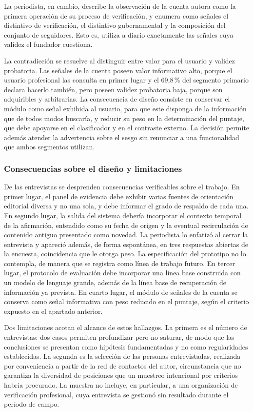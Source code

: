 La periodista, en cambio, describe la observación de la cuenta autora como la primera operación de su proceso de verificación, y enumera como señales el distintivo de verificación, el distintivo gubernamental y la composición del conjunto de seguidores. Esto es, utiliza a diario exactamente las señales cuya validez el fundador cuestiona.

La contradicción se resuelve al distinguir entre valor para el usuario y validez probatoria. Las señales de la cuenta poseen valor informativo alto, porque el usuario profesional las consulta en primer lugar y el 69,8\,\% del segmento primario declara hacerlo también, pero poseen validez probatoria baja, porque son adquiribles y arbitrarias. La consecuencia de diseño consiste en conservar el módulo como señal exhibida al usuario, para que este disponga de la información que de todos modos buscaría, y reducir su peso en la determinación del puntaje, que debe apoyarse en el clasificador y en el contraste externo. La decisión permite además atender la advertencia sobre el sesgo sin renunciar a una funcionalidad que ambos segmentos utilizan.

\subsubsection{Consecuencias sobre el diseño y limitaciones}

De las entrevistas se desprenden consecuencias verificables sobre el trabajo. En primer lugar, el panel de evidencia debe exhibir varias fuentes de orientación editorial diversa y no una sola, y debe informar el grado de respaldo de cada una. En segundo lugar, la salida del sistema debería incorporar el contexto temporal de la afirmación, entendido como su fecha de origen y la eventual recirculación de contenido antiguo presentado como novedad. La periodista lo enfatizó al cerrar la entrevista y apareció además, de forma espontánea, en tres respuestas abiertas de la encuesta, coincidencia que le otorga peso. La especificación del prototipo no lo contempla, de manera que se registra como línea de trabajo futuro. En tercer lugar, el protocolo de evaluación debe incorporar una línea base construida con un modelo de lenguaje grande, además de la línea base de recuperación de información ya prevista. En cuarto lugar, el módulo de señales de la cuenta se conserva como señal informativa con peso reducido en el puntaje, según el criterio expuesto en el apartado anterior.

Dos limitaciones acotan el alcance de estos hallazgos. La primera es el número de entrevistas: dos casos permiten profundizar pero no saturar, de modo que las conclusiones se presentan como hipótesis fundamentadas y no como regularidades establecidas. La segunda es la selección de las personas entrevistadas, realizada por conveniencia a partir de la red de contactos del autor, circunstancia que no garantiza la diversidad de posiciones que un muestreo intencional por criterios habría procurado. La muestra no incluye, en particular, a una organización de verificación profesional, cuya entrevista se gestionó sin resultado durante el período de campo.

